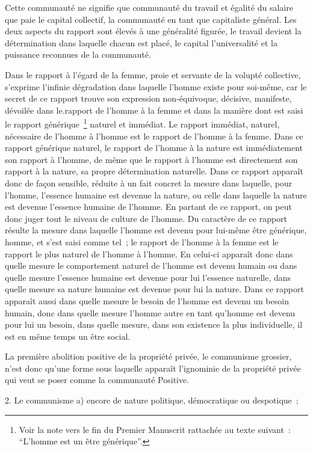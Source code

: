 \documentclass[french,twoside]{book} %
\begin{document}
Cette communauté ne signifie que communauté du travail et égalité du salaire que paie le capital collectif, la communauté en tant que capitaliste général. Les deux aspects du rapport sont élevés à une généralité figurée, le travail devient la détermination dans laquelle chacun est placé, le capital l’universalité et la puissance reconnues de la communauté.\par
Dans le rapport à l’égard de la femme, proie et servante de la volupté collective, s’exprime l’infinie dégradation dans laquelle l’homme existe pour soi-même, car le secret de ce rapport trouve son expression non-équivoque, décisive, manifeste, dévoilée dans le.rapport de l’homme à la femme et dans la manière dont est saisi le rapport générique \footnote{Voir la note vers le fin du Premier Manuscrit rattachée au texte suivant : “L’homme est un être générique”.} naturel et immédiat. Le rapport immédiat, naturel, nécessaire de l’homme à l’homme est le rapport de l’homme à la femme. Dans ce rapport générique naturel, le rapport de l’homme à la nature est immédiatement son rapport à l’homme, de même que le rapport à l’homme est directement son rapport à la nature, sa propre détermination naturelle. Dans ce rapport apparaît donc de façon sensible, réduite à un fait concret la mesure dans laquelle, pour l’homme, l’essence humaine est devenue la nature, ou celle dans laquelle la nature est devenue l’essence humaine de l’homme. En partant de ce rapport, on peut donc juger tout le niveau de culture de l’homme. Du caractère de ce rapport résulte la mesure dans laquelle l’homme est devenu pour lui-même être générique, homme, et s’est saisi comme tel ; le rapport de l’homme à la femme est le rapport le plus naturel de l’homme à l’homme. En celui-ci apparaît donc dans quelle mesure le comportement naturel de l’homme est devenu humain ou dans quelle mesure l’essence humaine est devenue pour lui l’essence naturelle, dans quelle mesure sa nature humaine est devenue pour lui la nature. Dans ce rapport apparaît aussi dans quelle mesure le besoin de l’homme est devenu un besoin humain, donc dans quelle mesure l’homme autre en tant qu’homme est devenu pour lui un besoin, dans quelle mesure, dans son existence la plus individuelle, il est en même temps un être social.\par
La première abolition positive de la propriété privée, le communisme grossier, n’est donc qu’une forme sous laquelle apparaît l’ignominie de la propriété privée qui veut se poser comme la communauté Positive.\par
2. Le communisme a) encore de nature politique, démocratique ou despotique ;\par
\end{document}
